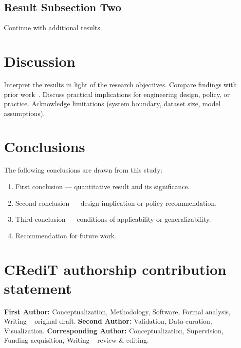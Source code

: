 \documentclass[preprint,12pt,3p]{elsarticle}
\begin{document}
\subsection{Result Subsection Two}
Continue with additional results.

\section{Discussion}
\label{sec:discussion}

Interpret the results in light of the research objectives.
Compare findings with prior work~\cite{PriorWork2022}.
Discuss practical implications for engineering design, policy, or practice.
Acknowledge limitations (system boundary, dataset size, model assumptions).

\section{Conclusions}
\label{sec:conclusions}

The following conclusions are drawn from this study:
\begin{enumerate}
  \item First conclusion — quantitative result and its significance.
  \item Second conclusion — design implication or policy recommendation.
  \item Third conclusion — conditions of applicability or generalizability.
  \item Recommendation for future work.
\end{enumerate}

\section*{CRediT authorship contribution statement}
\textbf{First Author:} Conceptualization, Methodology, Software, Formal analysis,
Writing -- original draft.
\textbf{Second Author:} Validation, Data curation, Visualization.
\textbf{Corresponding Author:} Conceptualization, Supervision, Funding acquisition,
Writing -- review \& editing.
\end{document}
